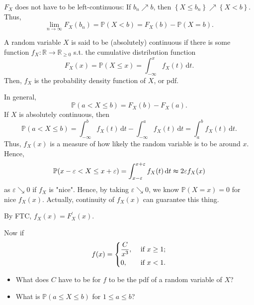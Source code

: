 \begin{note}
    \(F_X\) does not have to be left-continuous: If \(b_n \nearrow b\), then \(\left\{ X \le b_n \right\} \nearrow \left\{ X < b \right\}  \). Thus,
    \[
        \lim_{n \to \infty} F_X(b_n) = \mathbb{P} (X < b) = F_X(b) - \mathbb{P} (X = b). 
    \] 
\end{note}

\begin{definition}
    A random variable \(X\) is said to be (absolutely) continuous if there is some function \(f_X: \mathbb{R} \to \mathbb{R} _{\ge 0}\) s.t. the cumulative distribution function 
    \[
        F_X(x) = \mathbb{P} (X \le x) = \int _{-\infty }^x f_X(t) \, \mathrm{d} t. 
    \] 
    Then, \(f_X\) is the probability density function of \(X\), or pdf.   
\end{definition}

\begin{remark}
    In general,
    \[
        \mathbb{P} (a < X \le b) = F_X(b) - F_X(a).
    \]
    If \(X\) is absolutely continuous, then 
    \[
        \mathbb{P} (a < X \le b) = \int _{-\infty }^b f_X(t) \, \mathrm{d} t - \int _{-\infty }^a f_X(t) \, \mathrm{d} t = \int _a^b f_X(t) \, \mathrm{d} t.  
    \] 
    Thus, \(f_X(x)\) is a measure of how likely the random variable is to be around \(x\). Hence,
    \[
        \mathbb{P} (x - \varepsilon < X \le x + \varepsilon) = \int _{x - \varepsilon}^{x + \varepsilon } f_X(t) \, \mathrm{d} t \thickapprox 2 \varepsilon f_X(x) 
    \]  
    as \(\varepsilon \searrow 0\) if \(f_X\) is "nice". Hence, by taking \(\varepsilon \searrow 0\), we know \(\mathbb{P} (X = x) = 0\) for nice \(f_X(x)\). Actually, continuity of \(f_X(x)\) can guarantee this thing.     
\end{remark}

\begin{remark}
    By FTC, \(f_X(x) = F_X^{\prime} (x)\). 
\end{remark}

\begin{eg}
    Now if 
    \[
        f(x) = \begin{dcases}
            \frac{C}{x^3}, &\text{ if } x \ge 1 ;\\
            0, &\text{ if } x < 1.
        \end{dcases}
    \]
    \begin{itemize}
        \item [(a)] What does \(C\) have to be for \(f\) to be the pdf of a random variable of \(X\)? 
        \item [(b)] What is \(\mathbb{P} (a \le X \le b)\) for \(1 \le a \le b\)?      
    \end{itemize}
\end{eg}

